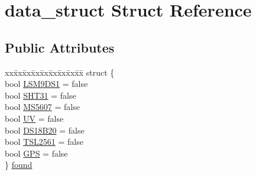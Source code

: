 \hypertarget{structdata__struct}{}\section{data\+\_\+struct Struct Reference}
\label{structdata__struct}
\subsection*{Public Attributes}
\begin{DoxyCompactItemize}
\item 
\begin{tabbing}
xx\=xx\=xx\=xx\=xx\=xx\=xx\=xx\=xx\=\kill
struct \{\\
\>bool \hyperlink{structdata__struct_a3ebcb5ba29d9ce30ce02d8bf5fa0f997}{LSM9DS1} = false\\
\>bool \hyperlink{structdata__struct_aa96945729f4df7683668e5ec1de3f669}{SHT31} = false\\
\>bool \hyperlink{structdata__struct_a5b810c790b9a5d830f15e36045a8d788}{MS5607} = false\\
\>bool \hyperlink{structdata__struct_a7b1c06118cc557e0b428514c14246726}{UV} = false\\
\>bool \hyperlink{structdata__struct_abe741a20e8c5e6695ae32937f878a83b}{DS18B20} = false\\
\>bool \hyperlink{structdata__struct_a660f4a6dd385f71ff63ff0d4319945d9}{TSL2561} = false\\
\>bool \hyperlink{structdata__struct_a7c48afe86be1096d0e802ab1c9cd4799}{GPS} = false\\
\} \hyperlink{structdata__struct_a6ca366a5fcb890803160e5ab98344bd1}{found}\\


\end{tabbing}
\end{DoxyCompactItemize}
